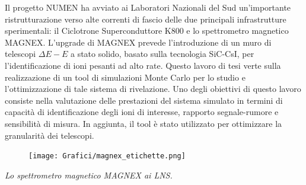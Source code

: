 \documentclass[10pt,foldmark,notumble]{leaflet}
\newcommand{\geant}{Geant4}
\begin{document}
Il progetto NUMEN ha avviato ai Laboratori Nazionali del Sud un'importante ristrutturazione verso alte correnti di fascio delle due principali infrastrutture sperimentali: il Ciclotrone Superconduttore K800 e lo spettrometro magnetico MAGNEX.
L'upgrade di MAGNEX prevede l'introduzione di un muro di telescopi $\Delta E - E$ a stato solido, basato sulla tecnologia SiC-CsI, per l'identificazione di ioni pesanti ad alto rate.
Questo lavoro di tesi verte sulla realizzazione di un tool di simulazioni Monte Carlo per lo studio e l'ottimizzazione di tale sistema di rivelazione.
Uno degli obiettivi di questo lavoro consiste nella valutazione delle prestazioni del sistema simulato in termini di capacità di identificazione degli ioni di interesse, rapporto segnale-rumore e sensibilità di misura.
In aggiunta, il tool è stato utilizzato per ottimizzare la granularità dei telescopi.



\begin{figure} [!h]
	\centering
	\texttt{[image: Grafici/magnex\_etichette.png]}
\end{figure}
\hspace{0.8 cm}\textit{ Lo spettrometro magnetico MAGNEX ai LNS.}


\end{document}
